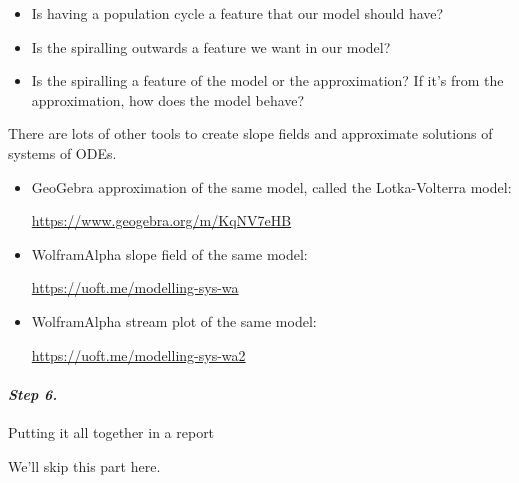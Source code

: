 \begin{example}
\begin{itemize}
	\item Is having a population cycle a feature that our model should have?
	\item Is the spiralling outwards a feature we want in our model?
	\item Is the spiralling a feature of the model or the approximation? If it's from the approximation, how does the model behave?
\end{itemize}

\end{example}

\begin{graybox}
There are lots of other tools to create slope fields and approximate solutions of systems of ODEs.

\begin{itemize}
	\item GeoGebra approximation of the same model, called the Lotka-Volterra model:
	
	\hfill \url{https://www.geogebra.org/m/KqNV7eHB} \hfill {}
	
	\item WolframAlpha slope field of the same model:

	\hfill \url{https://uoft.me/modelling-sys-wa} \hfill {}

	\item WolframAlpha stream plot of the same model:

	\hfill \url{https://uoft.me/modelling-sys-wa2} \hfill {}
\end{itemize}

\end{graybox}


\paragraph{\emph{Step 6.}} Putting it all together in a report

We'll skip this part here.




